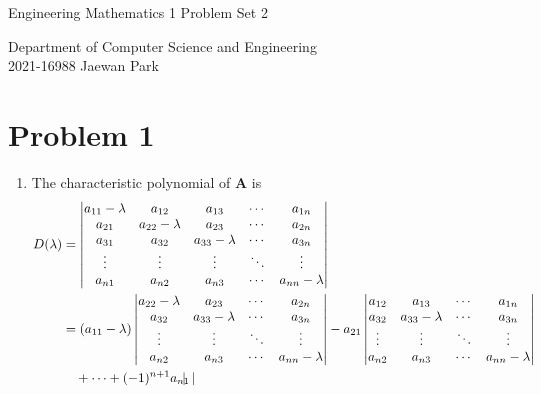 \documentclass[10pt]{article}
\begin{document}
\begin{center}
    {\LARGE Engineering Mathematics 1 Problem Set 2} \\
\end{center}
\begin{flushright}
    Department of Computer Science and Engineering \\
    2021-16988 Jaewan Park
\end{flushright}

\section*{Problem 1}
\begin{enumerate}[leftmargin=*, label={(\alph*)}]
    \item The characteristic polynomial of $\mathbf{A}$ is 
    \begin{align*}
        D(\lambda) &= \begin{vmatrix}
            a_{11} - \lambda & a_{12} & a_{13} & \cdots & a_{1n} \\
            a_{21} & a_{22} - \lambda & a_{23} & \cdots & a_{2n} \\ 
            a_{31} & a_{32} & a_{33} - \lambda & \cdots & a_{3n} \\ 
            \vdots & \vdots & \vdots & \ddots & \vdots \\
            a_{n1} & a_{n2} & a_{n3} & \cdots & a_{nn} - \lambda
        \end{vmatrix} \\
        &= \qty(a_{11} - \lambda)\begin{vmatrix}
            a_{22} - \lambda & a_{23} & \cdots & a_{2n} \\ 
            a_{32} & a_{33} - \lambda & \cdots & a_{3n} \\ 
            \vdots & \vdots & \ddots & \vdots \\
            a_{n2} & a_{n3} & \cdots & a_{nn} - \lambda
        \end{vmatrix} - a_{21}\begin{vmatrix}
            a_{12} & a_{13} & \cdots & a_{1n} \\
            a_{32} & a_{33} - \lambda & \cdots & a_{3n} \\ 
            \vdots & \vdots & \ddots & \vdots \\
            a_{n2} & a_{n3} & \cdots & a_{nn} - \lambda
        \end{vmatrix} \\ &\;\;\;\, + \cdots + (-1)^{n+1}a_{n1}\begin{vmatrix}

\end{vmatrix}
\end{align*}
\end{enumerate}
\end{document}
